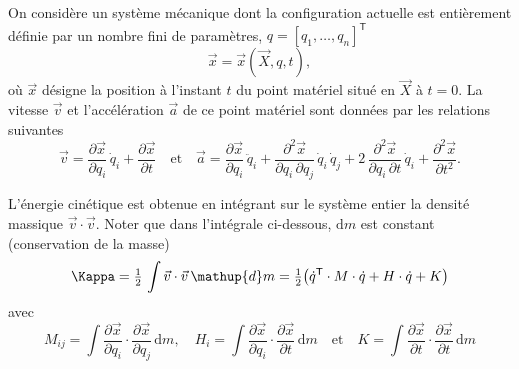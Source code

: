 \documentclass[12pt, final]{amsart}
\newcommand{\D}{\mathup{d}}
\newcommand{\T}{\mathsf{T}}
\begin{document}
\title{\sbtitle}
\author{\sbauthor}
\address{\sbaddress}

\begin{abstract}
  blabla
\end{abstract}

\maketitle

On considère un système mécanique dont la configuration actuelle est entièrement
définie par un nombre fini de paramètres, \(q=[q_1, \ldots, q_n]^\T\)
\begin{equation}
  \vec x=\vec x(\vec X, q, t),
\end{equation}
où \(\vec x\) désigne la position à l'instant \(t\) du point matériel situé en
\(\vec X\) à \(t=0\). La vitesse \(\vec v\) et l'accélération \(\vec a\) de ce
point matériel sont données par les relations suivantes
\begin{equation}
  \vec v=\frac{\partial\vec x}{\partial q_i}\,\dot{q}_i
  +\frac{\partial\vec x}{\partial t}
  \quad\text{et}\quad
  \vec a=\frac{\partial\vec x}{\partial q_i}\,\ddot{q}_i
  +\frac{\partial^2\vec x}{\partial q_i\,\partial q_j}\,\dot{q}_i\,\dot{q}_j
  +2\,\frac{\partial^2\vec x}{\partial q_i\,\partial t}\,\dot{q}_i
  +\frac{\partial^2\vec x}{\partial t^2}.
\end{equation}

L'énergie cinétique est obtenue en intégrant sur le système entier la densité
massique \(\vec v\cdot\vec v\). Noter que dans l'intégrale ci-dessous,
\(\D m\) est constant (conservation de la masse)
\begin{equation}
  \Kappa=\tfrac12\,\int\vec v\cdot\vec v\,\D m
  =\tfrac12\bigl(\dot{q}^\T\cdot M\cdot\dot{q}+H\cdot\dot{q}+K\bigr)
\end{equation}
avec
\begin{equation}
  M_{ij}=\int\frac{\partial\vec x}{\partial q_i}
  \cdot\frac{\partial\vec x}{\partial q_j}\,\D m,\quad
  H_i=\int\frac{\partial\vec x}{\partial q_i}
  \cdot\frac{\partial\vec x}{\partial t}\,\D m
  \quad\text{et}\quad
  K=\int\frac{\partial\vec x}{\partial t}
  \cdot\frac{\partial\vec x}{\partial t}\,\D m
\end{equation}
\end{document}
